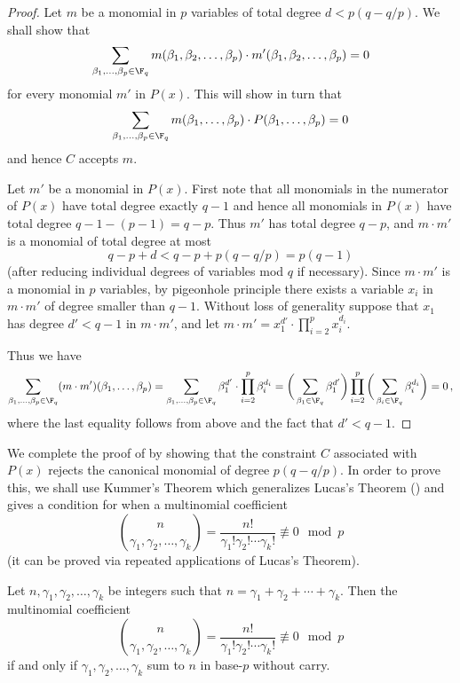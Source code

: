 \begin{proof}
Let $m$ be a monomial in $p$ variables of total degree $d < p (q-q/p)$. We shall show that $$\sum_{\beta_1,\ldots, \beta_p \in \F_q} m(\beta_1,\beta_2,\ldots,\beta_p)  \cdot m'(\beta_1,\beta_2,\ldots, \beta_p)=0 $$ for every monomial $m'$ in $P(x)$. This will show in turn that $$\sum_{\beta_1,\ldots,\beta_p \in \F_q} m(\beta_1,\ldots,\beta_p) \cdot P(\beta_1,\ldots,\beta_p) =0$$ and hence $C$ accepts $m$.

Let $m'$ be a monomial in $P(x)$. First note that all monomials in the numerator of $P(x)$ have total degree exactly $q-1$ and hence all monomials
in $P(x)$ have total degree $q-1-(p-1)=q-p$. Thus $m'$ has total degree $q-p$, and $m \cdot m'$ is a monomial of total degree at most
$$q-p +d <
q-p + p(q-q/p) = p(q-1)$$ (after reducing individual degrees of variables mod $q$ if necessary).  Since $m \cdot m'$ is a monomial in $p$ variables, by pigeonhole principle there exists a variable $x_i$ in $m \cdot m'$ of degree smaller than $q-1$. Without loss of generality suppose that $x_1$ has degree $d' < q-1$ in $m \cdot m'$, and let $m \cdot m' = x_1^{d'} \cdot
\prod_{i=2}^{p} x_i^{d_i}$.

Thus we have
%
%
\begin{equation*}
 \sum_{\beta_1,\ldots,\beta_p \in \F_q} (m \cdot m') (\beta_1,\ldots,\beta_p)   = 
 \sum_{\beta_1,\ldots,\beta_p \in \F_q}  \beta_1^{d'} \cdot  \prod_{i=2}^{p} \beta_i^{d_i}  
 =  \bigg(\sum_{\beta_1 \in \F_q} \beta_1^{d'}\bigg) \prod_{i=2}^p \bigg( \sum_{\beta_i \in \F_q} \beta_i^{d_i}\bigg)
  =  0\,,
  \end{equation*}
%
%
where the last equality follows from  above and the fact that $d' <q-1$.
\end{proof}

We complete the proof of  by showing that the constraint $C$ associated with $P(x)$ rejects the canonical
monomial of degree $p(q-q/p)$. In order to prove this, we shall use Kummer's Theorem which generalizes Lucas's Theorem () and
gives a condition for when a multinomial coefficient
\[
\binom  {n}  {\gamma_1, \gamma_2,\ldots, \gamma_k} =
\frac {n!} {\gamma_1! \gamma_2! \cdots \gamma_k!} \not \equiv 0 \mod
p
\]
(it can be proved via repeated applications of Lucas's Theorem).


\begin{theorem}
Let $n, \gamma_1,\gamma_2,\ldots,\gamma_k$ be integers such that $n = \gamma_1 + \gamma_2 + \cdots + \gamma_k$.
Then the multinomial coefficient 
\[
\binom {n}  {\gamma_1, \gamma_2,\ldots, \gamma_k} =
\frac {n!} {\gamma_1! \gamma_2 ! \cdots \gamma_k!} \not \equiv 0 \mod
p
\]
if and only if $\gamma_1, \gamma_2 , \ldots, \gamma_k$ sum
to $n$ in base-$p$ without carry.
\end{theorem}

